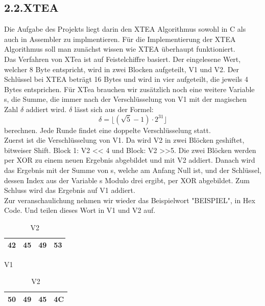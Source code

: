 \documentclass[course=asp]{aspdoc}
\begin{document}
\subsection*{2.2.XTEA}
Die Aufgabe des Projekts liegt darin den XTEA Algorithmus sowohl in C als auch in Assembler zu implmentieren. Für die Implementierung der XTEA Algorithmus soll man zunächst wissen wie XTEA überhaupt funktioniert. \\
Das Verfahren von XTea ist auf Feistelchiffre basiert. Der eingelesene Wert, welcher 8 Byte entspricht, wird in zwei Blocken aufgeteilt, V1 und V2. Der Schlüssel bei XTEA beträgt 16 Bytes und wird in vier aufgeteilt, die jeweils 4 Bytes entsprichen. Für XTea brauchen wir zusätzlich noch eine weitere Variable s, die Summe, die immer nach der Verschlüsselung von V1 mit der magischen Zahl ${\delta}$ addiert wird. ${\delta}$ lässt sich aus der Formel:
\begin{equation}
     \delta  =   \lfloor ( \surd 5 -1)  \cdot  2^{31} \rfloor
\end{equation}
berechnen. Jede Runde findet eine doppelte Verschlüsselung statt.~\cite{appel2016sicherheitsaspekte} \\
Zuerst ist die Verschlüsselung von V1. Da wird V2 in zwei Blöcken geshiftet, bitweiser Shift. Block 1: V2 << 4 und Block: V2 >>5. Die zwei Blöcken werden per XOR zu einem neuen Ergebnis abgebildet und mit V2 addiert. Danach wird das Ergebnis mit der Summe von s, welche am Anfang Null ist, und der Schlüssel, dessen Index aus der Variable s Modulo drei ergibt, per XOR abgebildet. Zum Schluss wird das Ergebnis auf V1 addiert. \\
Zur veranschaulichung nehmen wir wieder das Beispielwort "BEISPIEL", in Hex Code. Und teilen dieses Wort in V1 und V2 auf.
\begin{table}[H]

    \begin{minipage}{.5\linewidth}

      \centering
        \begin{tabular}{|l|l|l|l|}
		\hline
            42 & 45 & 49 & 53   \\
		\hline
        \end{tabular}

	\caption{V1}
    \end{minipage}%
    \begin{minipage}{.5\linewidth}

 \centering

        \begin{tabular}{|l|l|l|l|}
           \hline
		 50 & 49 & 45 & 4C   \\
		\hline
        \end{tabular}
\caption{V2}
    \end{minipage}
\end{table}
\end{document}
